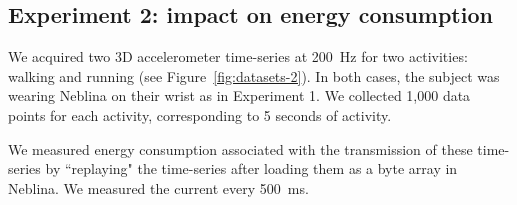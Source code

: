 \documentclass[10pt, conference, compsocconf]{IEEEtran}
\begin{document}

\subsection{Experiment 2: impact on energy consumption}

We acquired two 3D accelerometer time-series at 200~Hz for two 
activities: walking and running (see Figure~\ref{fig:datasets-2}). In 
both cases, the subject was wearing Neblina on their wrist as in 
Experiment 1. We collected 1,000 data points for each activity, 
corresponding to 5 seconds of activity.

We measured energy consumption associated with the transmission of
these time-series by
``replaying" the time-series after loading them as a byte array in
Neblina. We measured the current every 500~ms.
\end{document}
